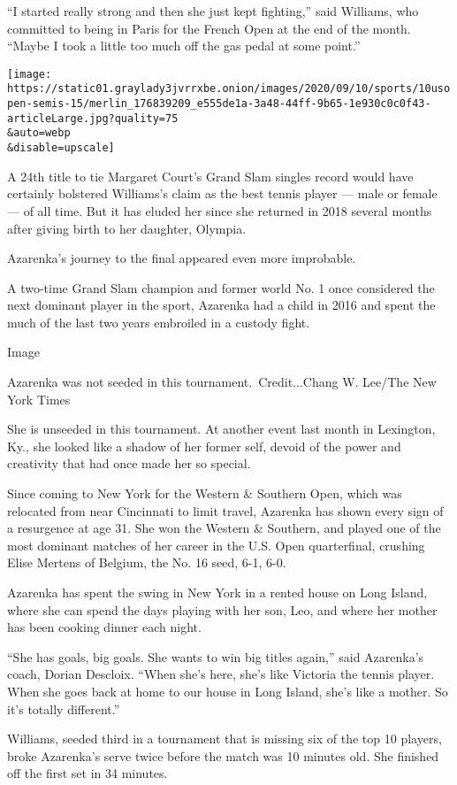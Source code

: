 ``I started really strong and then she just kept fighting,'' said
Williams, who committed to being in Paris for the French Open at the end
of the month. ``Maybe I took a little too much off the gas pedal at some
point.''

\texttt{[image: https://static01.graylady3jvrrxbe.onion/images/2020/09/10/sports/10usopen-semis-15/merlin\_176839209\_e555de1a-3a48-44ff-9b65-1e930c0c0f43-articleLarge.jpg?quality=75\\\&auto=webp\\\&disable=upscale]}

A 24th title to tie Margaret Court's Grand Slam singles record would
have certainly bolstered Williams's claim as the best tennis player ---
male or female --- of all time. But it has eluded her since she returned
in 2018 several months after giving birth to her daughter, Olympia.

Azarenka's journey to the final appeared even more improbable.

A two-time Grand Slam champion and former world No. 1 once considered
the next dominant player in the sport, Azarenka had a child in 2016 and
spent the much of the last two years embroiled in a custody fight.

Image

Azarenka was not seeded in this tournament.~Credit...Chang W. Lee/The
New York Times

She is unseeded in this tournament. At another event last month in
Lexington, Ky., she looked like a shadow of her former self, devoid of
the power and creativity that had once made her so special.

Since coming to New York for the Western \& Southern Open, which was
relocated from near Cincinnati to limit travel, Azarenka has shown every
sign of a resurgence at age 31. She won the Western \& Southern, and
played one of the most dominant matches of her career in the U.S. Open
quarterfinal, crushing Elise Mertens of Belgium, the No. 16 seed, 6-1,
6-0.

Azarenka has spent the swing in New York in a rented house on Long
Island, where she can spend the days playing with her son, Leo, and
where her mother has been cooking dinner each night.

``She has goals, big goals. She wants to win big titles again,'' said
Azarenka's coach, Dorian Descloix. ``When she's here, she's like
Victoria the tennis player. When she goes back at home to our house in
Long Island, she's like a mother. So it's totally different.''

Williams, seeded third in a tournament that is missing six of the top 10
players, broke Azarenka's serve twice before the match was 10 minutes
old. She finished off the first set in 34 minutes.

